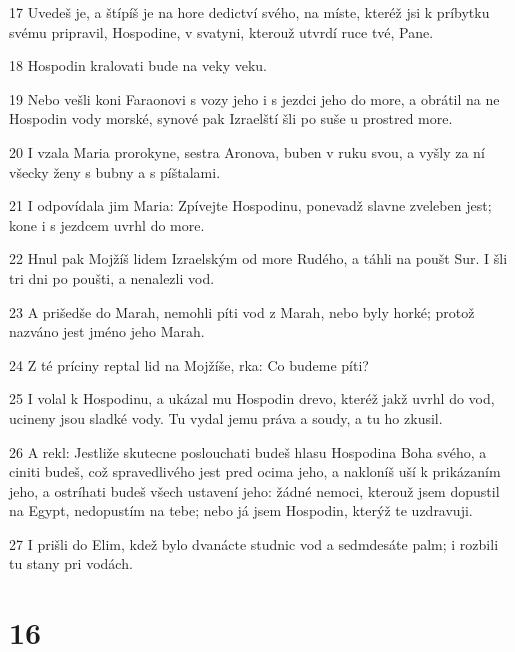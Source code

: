 \par 17 Uvedeš je, a štípíš je na hore dedictví svého, na míste, kteréž jsi k príbytku svému pripravil, Hospodine, v svatyni, kterouž utvrdí ruce tvé, Pane.
\par 18 Hospodin kralovati bude na veky veku.
\par 19 Nebo vešli koni Faraonovi s vozy jeho i s jezdci jeho do more, a obrátil na ne Hospodin vody morské, synové pak Izraelští šli po suše u prostred more.
\par 20 I vzala Maria prorokyne, sestra Aronova, buben v ruku svou, a vyšly za ní všecky ženy s bubny a s píštalami.
\par 21 I odpovídala jim Maria: Zpívejte Hospodinu, ponevadž slavne zveleben jest; kone i s jezdcem uvrhl do more.
\par 22 Hnul pak Mojžíš lidem Izraelským od more Rudého, a táhli na poušt Sur. I šli tri dni po poušti, a nenalezli vod.
\par 23 A prišedše do Marah, nemohli píti vod z Marah, nebo byly horké; protož nazváno jest jméno jeho Marah.
\par 24 Z té príciny reptal lid na Mojžíše, rka: Co budeme píti?
\par 25 I volal k Hospodinu, a ukázal mu Hospodin drevo, kteréž jakž uvrhl do vod, ucineny jsou sladké vody. Tu vydal jemu práva a soudy, a tu ho zkusil.
\par 26 A rekl: Jestliže skutecne poslouchati budeš hlasu Hospodina Boha svého, a ciniti budeš, což spravedlivého jest pred ocima jeho, a nakloníš uší k prikázaním jeho, a ostríhati budeš všech ustavení jeho: žádné nemoci, kterouž jsem dopustil na Egypt, nedopustím na tebe; nebo já jsem Hospodin, kterýž te uzdravuji.
\par 27 I prišli do Elim, kdež bylo dvanácte studnic vod a sedmdesáte palm; i rozbili tu stany pri vodách.

\chapter{16}

